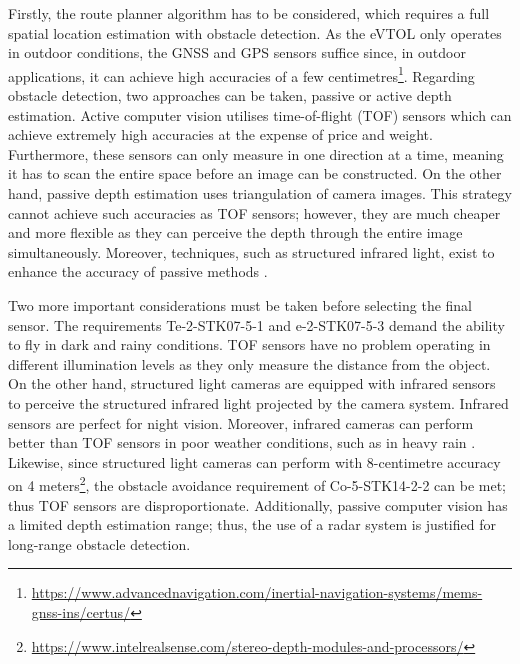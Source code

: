 Firstly, the route planner algorithm has to be considered, which requires a full spatial location estimation with obstacle detection.
As the eVTOL only operates in outdoor conditions, the GNSS and GPS sensors suffice since, in outdoor applications, it can achieve high accuracies of a few centimetres\footnote{\url{https://www.advancednavigation.com/inertial-navigation-systems/mems-gnss-ins/certus/}}.
Regarding obstacle detection, two approaches can be taken, passive or active depth estimation.
Active computer vision utilises time-of-flight (TOF) sensors which can achieve extremely high accuracies at the expense of price and weight.
Furthermore, these sensors can only measure in one direction at a time, meaning it has to scan the entire space before an image can be constructed.
On the other hand, passive depth estimation uses triangulation of camera images.
This strategy cannot achieve such accuracies as TOF sensors; however, they are much cheaper and more flexible as they can perceive the depth through the entire image simultaneously.
Moreover, techniques, such as structured infrared light, exist to enhance the accuracy of passive methods \cite{structured_light}.

Two more important considerations must be taken before selecting the final sensor.
The requirements Te-2-STK07-5-1 and e-2-STK07-5-3 demand the ability to fly in dark and rainy conditions.
TOF sensors have no problem operating in different illumination levels as they only measure the distance from the object.
On the other hand, structured light cameras are equipped with infrared sensors to perceive the structured infrared light projected by the camera system.
Infrared sensors are perfect for night vision.
Moreover, infrared cameras can perform better than TOF sensors in poor weather conditions, such as in heavy rain \cite{rainy_vision}.
Likewise, since structured light cameras can perform with 8-centimetre accuracy on 4 meters\footnote{\url{https://www.intelrealsense.com/stereo-depth-modules-and-processors/}}, the obstacle avoidance requirement of Co-5-STK14-2-2 can be met; thus TOF sensors are disproportionate.
Additionally, passive computer vision has a limited depth estimation range; thus, the use of a radar system is justified for long-range obstacle detection.

